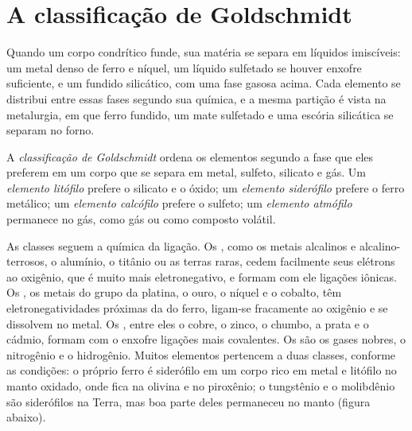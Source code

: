 \section{A classificação de Goldschmidt}

Quando um corpo condrítico funde, sua matéria se separa em líquidos imiscíveis: um
metal denso de ferro e níquel, um líquido sulfetado se houver enxofre suficiente, e um
fundido silicático, com uma fase gasosa acima. Cada elemento se distribui entre
essas fases segundo sua química, e a mesma partição é vista na
metalurgia, em que ferro fundido, um mate sulfetado e uma escória silicática se separam no
forno.

\begin{definition}
\label{def:b2:elements-in-the-earth:goldschmidt}
A \emph{classificação de Goldschmidt} ordena
os elementos segundo a fase que eles preferem em um corpo que se separa em metal,
sulfeto, silicato e gás. Um \emph{elemento litófilo}
prefere o silicato e o óxido; um \emph{elemento siderófilo}
prefere o ferro metálico; um \emph{elemento
calcófilo} prefere o sulfeto; um \emph{elemento
atmófilo} permanece no gás, como gás ou como composto
volátil.
\end{definition}

As classes seguem a química da ligação. Os , como os metais
alcalinos e alcalino-terrosos, o alumínio, o titânio ou as terras raras, cedem
facilmente seus elétrons ao oxigênio, que é muito mais eletronegativo, e
formam com ele ligações iônicas. Os , os metais do grupo da platina, o ouro,
o níquel e o cobalto, têm eletronegatividades próximas da do ferro, ligam-se fracamente
ao oxigênio e se dissolvem no metal. Os , entre eles o cobre, o zinco, o chumbo,
a prata e o cádmio, formam com o enxofre ligações mais covalentes.
Os  são os gases nobres, o nitrogênio e o hidrogênio. Muitos
elementos pertencem a duas classes, conforme as condições: o próprio ferro é
siderófilo em um corpo rico em metal e litófilo no manto oxidado, onde
fica na olivina e no piroxênio; o tungstênio e o molibdênio são siderófilos na
Terra, mas boa parte deles permaneceu no manto (figura abaixo).

